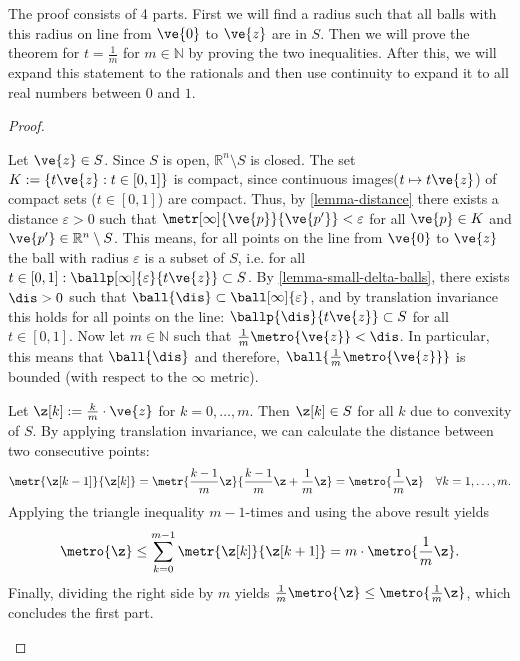 The proof consists of 4 parts.
First we will find a radius such that all balls with this radius on line from $\ve{0}$ to $\ve{z}$ are in $S$.
Then we will prove the theorem for $t = \frac{1}{m}$ for $m \in \mathbb{N}$ by proving the two inequalities.
After this, we will expand this statement to the rationals and then use continuity to expand it to all real numbers between $0$ and $1$.

\begin{proof}

	\setcounter{proofpart}{-1}


	\begin{proofpart} \label{lemma-part0}
    Let $\ve{z} \in S$.
    Since $S$ is open, $\mathbb{R}^{n} \setminus S$ is closed. The set $K := \{t \ve{z} : t \in [0,1]\}$ is compact, since continuous images($t \mapsto t \ve{z}$) of compact sets ($t \in [0,1]$) are compact.
    Thus, by \cref{lemma-distance} there exists a distance $\varepsilon > 0$ such that $\metr[\infty]{\ve{p}}{\ve{p'}} < \varepsilon$ for all $\ve{p} \in K$ and $\ve{p'} \in \mathbb{R}^{n} \setminus S$.
    This means, for all points on the line from $\ve{0}$ to $\ve{z}$ the ball with radius $\varepsilon$ is a subset of $S$, i.e. for all $t \in [0,1]: \ballp[\infty]{\varepsilon}{t\ve{z}} \subset S$.
    By \cref{lemma-small-delta-balls}, there exists $\dis > 0$ such that $\ball{\dis} \subset \ball[\infty]{\varepsilon}$, and by translation invariance this holds for all points on the line: $\ballp{\dis}{t\ve{z}} \subset S$ for all $t \in [0,1]$.
    Now let $m \in \mathbb{N}$ such that $\frac{1}{m} \metro{\ve{z}} < \dis$.
    In particular, this means that $\ball{\dis}$ and therefore, $\ball{\frac{1}{m} \metro{\ve{z}}}$ is bounded (with respect to the $\infty$ metric).
	\end{proofpart}



  \begin{proofpart}[$t \metro{\ve{z}} \leq \metro{t \ve{z}}$ for $t = \frac{1}{m} < d$ with $m \in \mathbb{N}$]\label{lemma-part1}
    Let $\z[k] := \frac{k}{m} \cdot \ve{z}$ for $k =0, \dots, m$. Then $\z[k] \in S$ for all $k$ due to convexity of $S$.
		By applying translation invariance, we can calculate the distance between two consecutive points:
		$$\metr{\z[k-1]}{\z[k]} = \metr{\frac{k-1}{m} \z}{\frac{k-1}{m} \z + \frac1m \z} = \metro{\frac{1}{m} \z} \quad \forall k = 1, \dots, m.$$
		Applying the triangle inequality $m-1$-times and using the above result yields
		$$\metro{\z} \leq \sum_{k=0}^{m-1} \metr{\z[k]}{\z[k+1]} = m \cdot \metro{\frac{1}{m} \z}.$$
		Finally, dividing the right side by $m$ yields $\frac{1}{m} \metro{\z} \leq \metro{\frac{1}{m} \z}$, which concludes the first part.
	\end{proofpart}


\end{proof}
